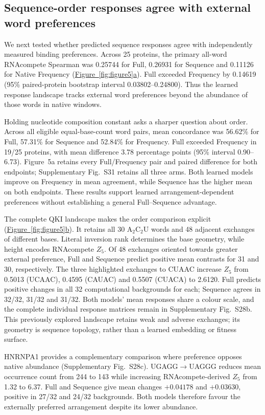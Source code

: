 \documentclass[webpdf,contemporary,large]{oup-authoring-template}
\newcommand{\figpanelref}[2]{\hyperref[#1]{Figure~\ref*{#1}#2}}
\newcommand{\supfig}[1]{Supplementary Fig.~#1}
\begin{document}
\subsection{Sequence-order responses agree with external word preferences}\label{subsec:external_preference}\label{subsec:perturb_results}

We next tested whether predicted sequence responses agree with independently measured binding preferences. Across 25 proteins, the primary all-word RNAcompete Spearman was 0.25744 for Full, 0.26931 for Sequence and 0.11126 for Native Frequency (\figpanelref{fig:figure5}{a}). Full exceeded Frequency by 0.14619 (95\% paired-protein bootstrap interval 0.03802--0.24800). Thus the learned response landscape tracks external word preferences beyond the abundance of those words in native windows.

Holding nucleotide composition constant asks a sharper question about order. Across all eligible equal-base-count word pairs, mean concordance was 56.62\% for Full, 57.31\% for Sequence and 52.84\% for Frequency. Full exceeded Frequency in 19/25 proteins, with mean difference 3.78 percentage points (95\% interval 0.90--6.73). Figure~5a retains every Full/Frequency pair and paired difference for both endpoints; \supfig{S31} retains all three arms. Both learned models improve on Frequency in mean agreement, while Sequence has the higher mean on both endpoints. These results support learned arrangement-dependent preferences without establishing a general Full--Sequence advantage.

The complete QKI landscape makes the order comparison explicit (\figpanelref{fig:figure5}{b}). It retains all 30 A$_2$C$_2$U words and 48 adjacent exchanges of different bases. Literal inversion rank determines the base geometry, while height encodes RNAcompete $Z_5$. Of 48 exchanges oriented towards greater external preference, Full and Sequence predict positive mean contrasts for 31 and 30, respectively. The three highlighted exchanges to CUAAC increase $Z_5$ from 0.5013 (UCAAC), 0.4595 (CAUAC) and 0.5507 (CUACA) to 2.6120. Full predicts positive changes in all 32 computational backgrounds for each; Sequence agrees in 32/32, 31/32 and 31/32. Both models' mean responses share a colour scale, and the complete individual response matrices remain in \supfig{S28b}. This previously explored landscape retains weak and adverse exchanges; its geometry is sequence topology, rather than a learned embedding or fitness surface.

HNRNPA1 provides a complementary comparison where preference opposes native abundance (\supfig{S28c}). UGAGG$\to$UAGGG reduces mean occurrence count from 244 to 143 while increasing RNAcompete-derived $Z_5$ from 1.32 to 6.37. Full and Sequence give mean changes $+0.04178$ and $+0.03630$, positive in 27/32 and 24/32 backgrounds. Both models therefore favour the externally preferred arrangement despite its lower abundance.
\end{document}
